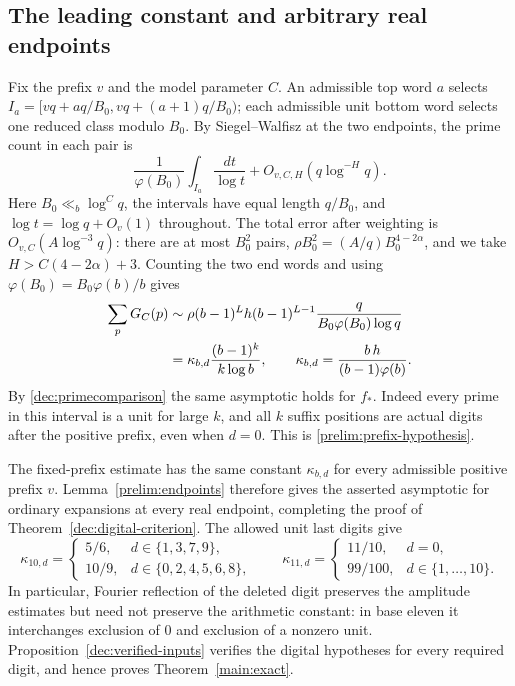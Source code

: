 \documentclass[11pt,a4paper]{article}
\theoremstyle{paperplain}
\numberwithin{equation}{section}
\begin{document}
\subsection{The leading constant and arbitrary real endpoints}
\label{dec:endpoints}

Fix the prefix $v$ and the model parameter $C$. An admissible top
word $a$ selects $I_a=[vq+a q/B_0,vq+(a+1)q/B_0)$; each admissible unit
bottom word selects one reduced class modulo $B_0$. By Siegel--Walfisz
at the two endpoints, the prime count in each pair is
\[
 \frac1{\varphi(B_0)}\int_{I_a}\frac{dt}{\log t}
       +O_{v,C,H}(q\log^{-H}q).
\]
Here $B_0\ll_b\log^C q$, the intervals have equal length $q/B_0$,
and $\log t=\log q+O_v(1)$ throughout. The total error after weighting
is $O_{v,C}(A\log^{-3}q)$: there are at most $B_0^2$ pairs,
$\rho B_0^2=(A/q)B_0^{4-2\alpha}$, and we take $H>C(4-2\alpha)+3$.
Counting the two end words and using $\varphi(B_0)=B_0\varphi(b)/b$ gives
\begin{align}
 \sum_pG_C(p)&\sim\rho(b-1)^Lh(b-1)^{L-1}
       \frac{q}{B_0\varphi(B_0)\log q}\notag\\
 &=\kappa_{b,d}\frac{(b-1)^k}{k\log b},\qquad
 \kappa_{b,d}=\frac{b\,h}{(b-1)\varphi(b)}.
 \label{dec:prefixasymptotic}
\end{align}
By \eqref{dec:primecomparison} the same asymptotic holds for $f_*$.
Indeed every prime in this interval is a unit for large $k$, and all
$k$ suffix positions are actual digits after the positive prefix, even
when $d=0$. This is \eqref{prelim:prefix-hypothesis}.

The fixed-prefix estimate has the same constant $\kappa_{b,d}$
for every admissible positive prefix $v$. Lemma~\ref{prelim:endpoints}
therefore gives the asserted asymptotic for ordinary expansions at every
real endpoint, completing the proof of
Theorem~\ref{dec:digital-criterion}. The allowed unit last digits give
\[
 \kappa_{10,d}=
 \begin{cases}
 5/6,&d\in\{1,3,7,9\},\\
 10/9,&d\in\{0,2,4,5,6,8\},
 \end{cases}
 \qquad
 \kappa_{11,d}=
 \begin{cases}
 11/10,&d=0,\\
 99/100,&d\in\{1,\ldots,10\}.
 \end{cases}
\]
In particular, Fourier reflection of the deleted digit preserves the
amplitude estimates but need not preserve the arithmetic constant:
in base eleven it interchanges exclusion of $0$ and exclusion of a
nonzero unit. Proposition~\ref{dec:verified-inputs} verifies the digital
hypotheses for every required digit, and hence proves
Theorem~\ref{main:exact}.
\end{document}
